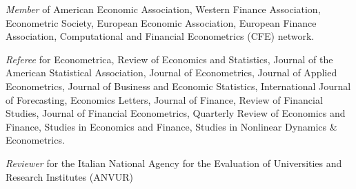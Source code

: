 \documentclass[12pt]{article}
\begin{document}
\begin{description}
\item\emph{Member} of American Economic Association, Western Finance Association, Econometric Society, European Economic Association, European Finance Association, Computational and Financial Econometrics (CFE) network.

\item \emph{Referee} for Econometrica, Review of Economics and Statistics, Journal of the American Statistical Association, Journal of Econometrics, Journal of Applied Econometrics, Journal of Business and Economic Statistics, International Journal of Forecasting, Economics Letters, Journal of Finance, Review of Financial Studies, Journal of Financial Econometrics, Quarterly Review of Economics and Finance, Studies in Economics and Finance, Studies in Nonlinear Dynamics & Econometrics.


\item \emph{Reviewer} for the Italian National Agency for the Evaluation of Universities and Research Institutes (ANVUR) 
\end{description}
 
\end{document}

